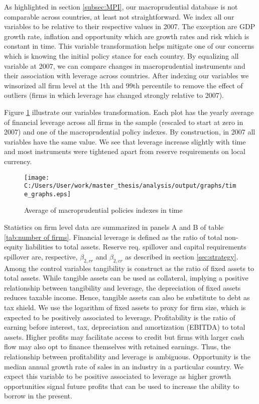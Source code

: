 \documentclass[12pt]{article}
\begin{document}
	As highlighted in section \ref{subsec:MPI}, our macroprudential database is not comparable across countries, at least not straightforward. We index all our variables to be relative to their respective values in 2007. The exception are GDP growth rate, inflation and opportunity which are growth rates and risk which is constant in time. This variable transformation helps mitigate one of our concerns which is knowing the initial policy stance for each country. By equalizing all variable at 2007, we can compare changes in macroprudential instruments and their association with leverage across countries. After indexing our variables we winsorized all firm level at the 1th and 99th percentile to remove the effect of outliers (firms in which leverage has changed strongly relative to 2007). 
	
	Figure \ref{fig:time graph} illustrate our variables transformation. Each plot has the yearly average of financial leverage across all firms in the sample (rescaled to start at zero in 2007) and one of the macroprudential policy indexes. By construction, in 2007 all variables have the same value. We see that leverage increase slightly with time and most instruments were tightened apart from reserve requirements on local currency.   
	
		\begin{figure}[h!]
		\centering
		\caption{Average of macroprudential policies indexes in time}
		\texttt{[image: C:/Users/User/work/master\_thesis/analysis/output/graphs/time\_graphs.eps]}
		\label{fig:time graph}
	\end{figure}
	
	Statistics on firm level data are summarized in panels A and B of table \ref{tab:number of firms}. Financial leverage is defined as the ratio of total non-equity liabilities to total assets. Reserve req. spillover and capital requirements spillover are, respective, $\beta_{2,rr}$ and $\beta_{2,cr}$ as described in section \ref{sec:strategy}. Among the control variables tangibility is construct as the ratio of fixed assets to total assets. While tangible assets can be used as collateral, implying a positive relationship between tangibility and leverage, the depreciation of fixed assets reduces taxable income. Hence, tangible assets can also be substitute to debt as tax shield. We use the logarithm of fixed assets to proxy for firm size, which is expected to be positively associated to leverage. Profitability is the ratio of earning before interest, tax, depreciation and amortization (EBITDA) to total assets. Higher profits may facilitate access to credit but firms with larger cash flow may also opt to finance themselves with retained earnings. Thus, the relationship between profitability and leverage is ambiguous. Opportunity is the median annual growth rate of sales in an industry in a particular country. We expect this variable to be positive associated to leverage as higher growth opportunities signal future profits that can be used to increase the ability to borrow in the present. 
	
\end{document}
